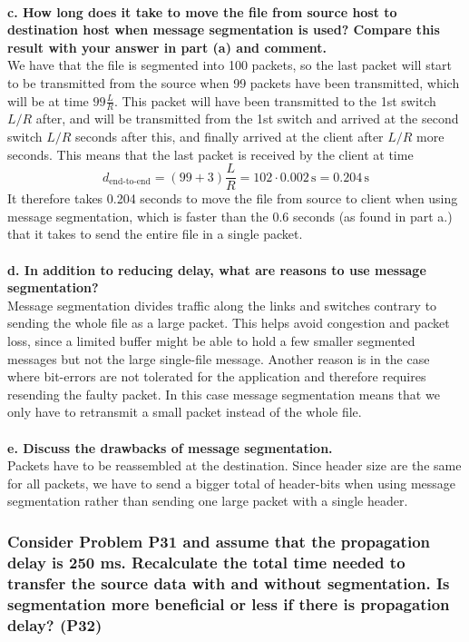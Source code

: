 \\
\textbf{c. How long does it take to move the file from source host to destination host when message segmentation is used? Compare this result with your answer in part (a) and comment.} \\
We have that the file is segmented into 100 packets, so the last packet will start to be transmitted from the source when 99 packets have been transmitted, which will be at time $99 \frac{L}{R}$. This packet will have been transmitted to the 1st switch $L/R$ after, and will be transmitted from the 1st switch and arrived at the second switch $L/R$ seconds after this, and finally arrived at the client after $L/R$ more seconds. This means that the last packet is received by the client at time 
\begin{equation*}
     d_\text{end-to-end} = (99 + 3) \frac{L}{R} = 102 \cdot 0.002 \, \text{s} =  0.204 \, \text{s}
\end{equation*}
It therefore takes 0.204 seconds to move the file from source to client when using message segmentation, which is faster than the 0.6 seconds (as found in part a.) that it takes to send the entire file in a single packet. \\
\\
\textbf{d. In addition to reducing delay, what are reasons to use message segmentation?} \\
Message segmentation divides traffic along the links and switches contrary to sending the whole file as a large packet. This helps avoid congestion and packet loss, since a limited buffer might be able to hold a few smaller segmented messages but not the large single-file message. Another reason is in the case where bit-errors are not tolerated for the application and therefore requires resending the faulty packet. In this case message segmentation means that we only have to retransmit a small packet instead of the whole file. \\
\\
\textbf{e. Discuss the drawbacks of message segmentation.} \\
Packets have to be reassembled at the destination. Since header size are the same for all packets, we have to send a bigger total of header-bits when using message segmentation rather than sending one large packet with a single header.


\subsubsection{Consider Problem P31 and assume that the propagation delay is 250 ms. Recalculate the total time needed to transfer the source data with and without segmentation. Is segmentation more beneficial or less if there is propagation delay? (P32)}

